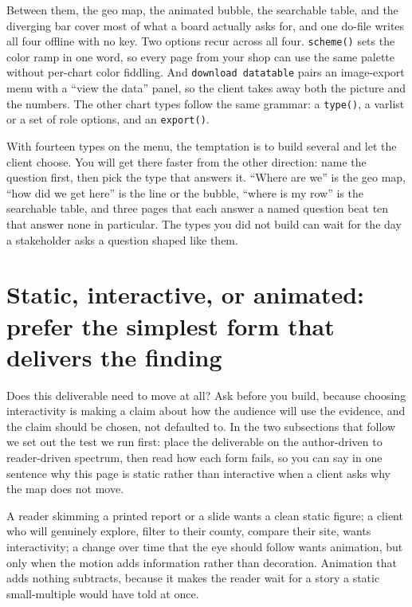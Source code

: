 Between them, the geo map, the animated bubble, the searchable table, and the diverging bar cover most of what a board actually asks for, and one do-file writes all four offline with no key. Two options recur across all four. \texttt{scheme()} sets the color ramp in one word, so every page from your shop can use the same palette without per-chart color fiddling. And \texttt{download datatable} pairs an image-export menu with a \enquote{view the data} panel, so the client takes away both the picture and the numbers. The other chart types follow the same grammar: a \texttt{type()}, a varlist or a set of role options, and an \texttt{export()}.

With fourteen types on the menu, the temptation is to build several and let the client choose. You will get there faster from the other direction: name the question first, then pick the type that answers it. \enquote{Where are we} is the geo map, \enquote{how did we get here} is the line or the bubble, \enquote{where is my row} is the searchable table, and three pages that each answer a named question beat ten that answer none in particular. The types you did not build can wait for the day a stakeholder asks a question shaped like them.

\section{Static, interactive, or animated: prefer the simplest form that delivers the finding}
Does this deliverable need to move at all? Ask before you build, because choosing interactivity is making a claim about how the audience will use the evidence, and the claim should be chosen, not defaulted to. In the two subsections that follow we set out the test we run first: place the deliverable on the author-driven to reader-driven spectrum, then read how each form fails, so you can say in one sentence why this page is static rather than interactive when a client asks why the map does not move.

A reader skimming a printed report or a slide wants a clean static figure; a client who will genuinely explore, filter to their county, compare their site, wants interactivity; a change over time that the eye should follow wants animation, but only when the motion adds information rather than decoration. Animation that adds nothing subtracts, because it makes the reader wait for a story a static small-multiple would have told at once.

